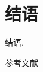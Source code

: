 \documentclass[UTF8,12pt,punct=kaiming,fontset=none]{ctexart}
\begin{document}
    \section{结语}
    结语.

    \begin{thebibliography}{99}
        参考文献
    \end{thebibliography}
\end{document}
